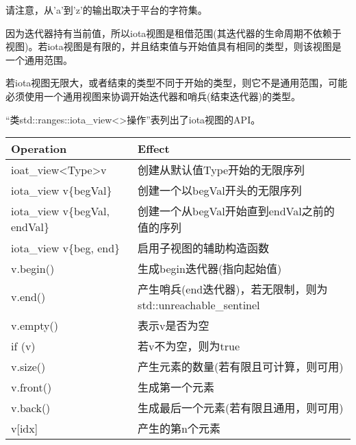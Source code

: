 请注意，从'a'到'z'的输出取决于平台的字符集。


因为迭代器持有当前值，所以iota视图是租借范围(其迭代器的生命周期不依赖于视图)。若iota视图是有限的，并且结束值与开始值具有相同的类型，则该视图是一个通用范围。

若iota视图无限大，或者结束的类型不同于开始的类型，则它不是通用范围，可能必须使用一个通用视图来协调开始迭代器和哨兵(结束迭代器)的类型。


“类std::ranges::iota\_view<>操作”表列出了iota视图的API。


\begin{longtable}[c]{|l|l|}
\hline
\textbf{Operation}       & \textbf{Effect}                                                    \\ \hline
\endfirsthead
%
\endhead
%
ioat\_view\textless{}Type\textgreater v & 创建从默认值Type开始的无限序列               \\ \hline
iota\_view v\{begVal\}   & 创建一个以begVal开头的无限序列                 \\ \hline
iota\_view v\{begVal, endVal\}          & 创建一个从begVal开始直到endVal之前的值的序列               \\ \hline
iota\_view v\{beg, end\} & 启用子视图的辅助构造函数                             \\ \hline
v.begin()                & 生成begin迭代器(指向起始值)         \\ \hline
v.end()                  & 产生哨兵(end迭代器)，若无限制，则为std::unreachable\_sentinel \\ \hline
v.empty()                & 表示v是否为空                                          \\ \hline
if (v)                   & 若v不为空，则为true                                             \\ \hline
v.size()                 & 产生元素的数量(若有限且可计算，则可用) \\ \hline
v.front()                & 生成第一个元素                                           \\ \hline
v.back()                 & 生成最后一个元素(若有限且通用，则可用)           \\ \hline
v{[}idx{]}               & 产生的第n个元素                                            \\ \hline
\end{longtable}

